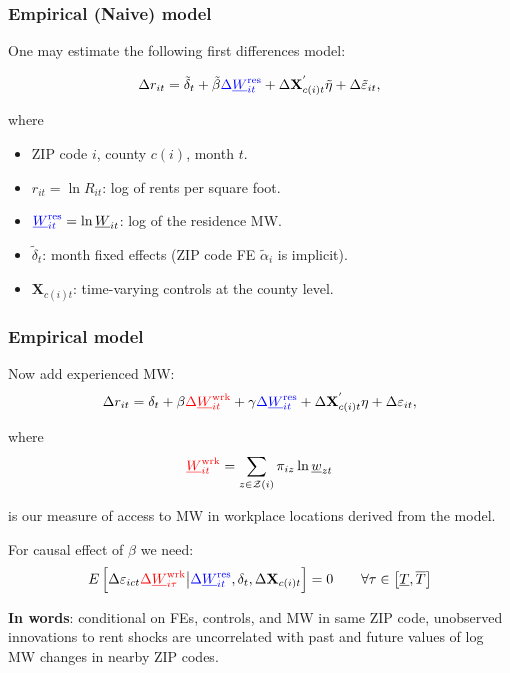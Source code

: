 \documentclass[aspectratio=169, t]{beamer}
\newcommand{\Z}{\mathcal{Z}}
\newcommand{\MW}{\underline{W}}
\begin{document}
\begin{frame}[label = stat_only_model]
    \frametitle{Empirical (Naive) model}
    
    One may estimate the following first differences model:
    
    $$
    \Delta r_{it} = \tilde\delta_t + 
    \tilde\beta {\color{blue} \Delta \MW^{\text{res}}_{it}} + 
    \Delta \mathbf{X}^{'}_{c(i)t} \tilde\eta + 
    \Delta \tilde\varepsilon_{it} ,
    $$
    
    where    
    \begin{itemize} \small
    \item ZIP code $i$, county $c(i)$, month $t$.
    
    \item \vspace{1mm} $r_{it} = \ln R_{it}$: log of rents per square foot.
    
    \item \vspace{1mm} ${\color{blue} \MW^{\text{res}}_{it}} = \ln \MW_{it}$: log of the residence MW.
    
    \item \vspace{1mm} $\tilde\delta_t$: month fixed effects (ZIP code FE $\tilde\alpha_i 
    $ is 
    implicit).
    
    \item \vspace{.5mm} $\mathbf{X}_{c(i)t}$: time-varying controls at the county level.
    \end{itemize}
\end{frame}

\begin{frame}
    \frametitle{Empirical model}
        
    Now add experienced MW:
    $$
    \Delta r_{it} = \delta_t +
        \beta {\color{red}\Delta \MW^{\text{wrk}}_{it}} +
        \gamma {\color{blue} \Delta \MW^{\text{res}}_{it}} + 
        \Delta \mathbf{X}^{'}_{c(i)t} \eta + 
        \Delta \varepsilon_{it} ,
    $$
    
    where 
    \[
    {\color{red} \MW^{\text{wrk}}_{it}} = 
        \sum_{z \in \Z(i)} \pi_{i z} \ln \underline{w}_{zt}
    \] 
    
    is our measure of access to MW in workplace locations derived from the model.


    \pause
    \vspace{2mm}
    For causal effect of $\beta$ we need:
    $$
    E \left[\Delta \varepsilon_{ict} {\color{red} \Delta 
    \MW^{\text{wrk}}_{i\tau}} 
    \big| {\color{blue}\Delta \MW^{\text{res}}_{it}}, \delta_t, \Delta 
    \mathbf{X}_{c(i)t} \right] = 0
    \quad \quad \forall \tau \in \left[ \underline{T}, \overline{T} \right]
    $$
    
    \pause
    \vspace{2mm}
    \textbf{In words}: conditional on FEs, controls, and {\color{blue} MW in same ZIP 
    code}, unobserved innovations to rent shocks are uncorrelated with past and future 
    values of log MW changes {\color{red} in nearby ZIP codes}.
\end{frame}
\end{document}
